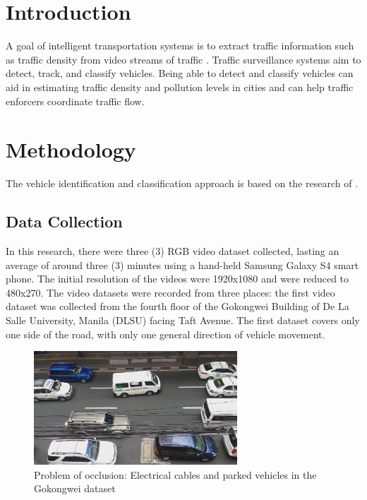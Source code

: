 \documentclass[conference]{IEEEtran}
\begin{document}
%
\IEEEpeerreviewmaketitle

\section{Introduction}
A goal of intelligent transportation systems is to extract traffic information such as traffic density from video streams of traffic \cite{Jun-Wei}. Traffic surveillance systems aim to detect, track, and classify vehicles. Being able to detect and classify vehicles can aid in estimating traffic density and pollution levels in cities and can help traffic enforcers coordinate traffic flow.

\section{Methodology}
\label{sec:methodology}
The vehicle identification and classification approach is based on the research of \cite{Jun-Wei}.

\subsection{Data Collection}

In this research, there were three (3) RGB video dataset collected, lasting an average of around three (3) minutes using a hand-held Samsung Galaxy S4 smart phone. The initial resolution of the videos were 1920x1080 and were reduced to 480x270. The video datasets were recorded from three places: the first video dataset was collected from the fourth floor of the Gokongwei Building of De La Salle University, Manila (DLSU) facing Taft Avenue. The first dataset covers only one side of the road, with only one general direction of vehicle movement.

\begin{figure}[!h]
\centering
\includegraphics[width=3in]{dataset1_sample.png}
\caption{Problem of occlusion: Electrical cables and parked vehicles in the Gokongwei dataset}
\label{fig_electrical_cables}
\end{figure}
\end{document}
